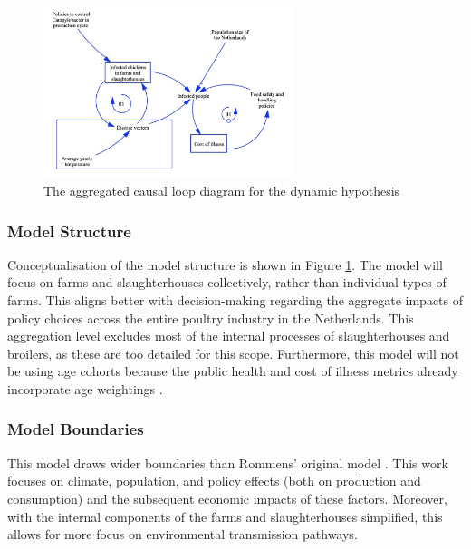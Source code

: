 \begin{figure}[h]
\centering
\includegraphics[width=0.65\textwidth]{images/dynamic_hypo2.png}
\caption{The aggregated causal loop diagram for the dynamic hypothesis}
\label{fig:aggregrated_cld}
\end{figure}
 
\subsubsection*{Model Structure}
Conceptualisation of the model structure is shown in Figure \ref{fig:aggregrated_cld}. The model will focus on farms and slaughterhouses collectively, rather than individual types of farms. This aligns better with decision-making regarding the aggregate impacts of policy choices across the entire poultry industry in the Netherlands. This aggregation level excludes most of the internal processes of slaughterhouses and broilers, as these are too detailed for this scope. Furthermore, this model will not be using age cohorts because the public health and cost of illness metrics already incorporate age weightings \parencite{mangen_campylobacteriosis_2007}.  %
\subsubsection*{Model Boundaries}

This model draws wider boundaries than Rommens' original model \parencite{rommens_infected_2020}. This work focuses on climate, population, and policy effects (both on production and consumption) and the subsequent economic impacts of these factors. Moreover, with the internal components of the farms and slaughterhouses simplified, this allows for more focus on environmental transmission pathways. 

